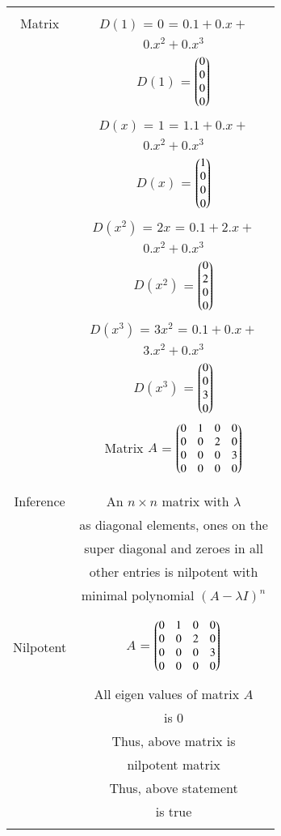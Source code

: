 \documentclass[journal,12pt,twocolumn]{IEEEtran}
\begin{document}
\begin{table}[h!]
\begin{center}
\begin{tabular}{|c|c|}
\hline
&\\
Matrix & $D(1)$ = $0$ = $0.1+0.x+$\\
& $0.x^2+0.x^3$\\
& $D(1)$ = $\begin{pmatrix}0\\0\\0\\0\end{pmatrix}$ \\
& $D(x)$ = $1$ = $1.1+0.x+$\\
& $0.x^2+0.x^3$\\
& $D(x)$ = $\begin{pmatrix}1\\0\\0\\0\end{pmatrix}$ \\
& $D(x^2)$ = $2x$ = $0.1+2.x+$\\
& $0.x^2+0.x^3$\\
& $D(x^2)$ = $\begin{pmatrix}0\\2\\0\\0\end{pmatrix}$ \\
& $D(x^3)$ = $3x^2$ = $0.1+0.x+$\\
& $3.x^2+0.x^3$\\
& $D(x^3)$ = $\begin{pmatrix}0\\0\\3\\0\end{pmatrix}$ \\
& Matrix $A$ = $\begin{pmatrix}0&1&0&0\\
                0&0&2&0\\
                0&0&0&3\\
                0&0&0&0\end{pmatrix}$\\
&\\
\hline
& \\
Inference & An $n\times n$ matrix with $\lambda$\\
& as diagonal elements, ones on the\\
& super diagonal and zeroes in all\\
& other entries is nilpotent with\\
& minimal polynomial $(A-\lambda I)^n$\\
&\\
\hline
& \\
Nilpotent & $A$ = $\begin{pmatrix}0&1&0&0\\
                0&0&2&0\\
                0&0&0&3\\
                0&0&0&0\end{pmatrix}$\\
& \\
& All eigen values of matrix $A$\\
& is $0$\\
& Thus, above matrix is \\
& nilpotent matrix \\
& Thus, above statement \\
& is true\\
& \\
\hline
\end{tabular}
\end{center}
\end{table}
\end{document}
